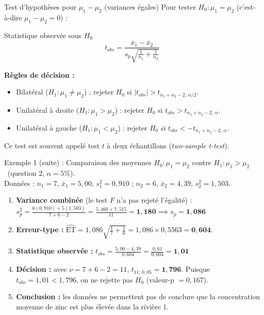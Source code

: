 \documentclass{BeamerTemplate}
\begin{document}
\begin{frame}[t]{Test d'hypothèses pour $\mu_1 - \mu_2$ (variances égales)}
  Pour tester $H_0: \mu_1 = \mu_2$ (c'est-à-dire $\mu_1 - \mu_2 = 0$) :

  \bigskip
  \begin{Boite}{Statistique observée sous $H_0$}
    \[
      t_{obs} = \frac{\overline{x}_1 - \overline{x}_2}{s_p \sqrt{\frac{1}{n_1} + \frac{1}{n_2}}}
    \]
  \end{Boite}

  \medskip
  \textbf{Règles de décision :}
  \begin{itemize}\itemsep 3mm
    \item Bilatéral ($H_1: \mu_1 \ne \mu_2$) : rejeter $H_0$ si $|t_{obs}| > t_{n_1+n_2-2,\, \alpha/2}$.
    \item Unilatéral à droite ($H_1: \mu_1 > \mu_2$) : rejeter $H_0$ si $t_{obs} > t_{n_1+n_2-2,\, \alpha}$.
    \item Unilatéral à gauche ($H_1: \mu_1 < \mu_2$) : rejeter $H_0$ si $t_{obs} < -t_{n_1+n_2-2,\, \alpha}$.
  \end{itemize}
  Ce test est souvent appelé \alert{test $t$ à deux échantillons} (\emph{two-sample t-test}).
\end{frame}

\begin{frame}[t]{Exemple 1 (suite) : Comparaison des moyennes}
  $H_0: \mu_1 = \mu_2$ contre $H_1: \mu_1 > \mu_2$ \ (question 2, $\alpha = 5\%$). \\
  Données : $n_1 = 7$, $\bar{x}_1 = 5{,}00$, $s_1^2 = 0{,}910$ ; $n_2 = 6$, $\bar{x}_2 = 4{,}39$, $s_2^2 = 1{,}503$.

  \begin{enumerate}\itemsep 1mm
    \item \textbf{Variance combinée} (le test $F$ n'a pas rejeté l'égalité) :
      $\displaystyle s_p^2 = \frac{6(0{,}910) + 5(1{,}503)}{7 + 6 - 2} = \frac{5{,}460 + 7{,}515}{11} = \mathbf{1{,}180} \implies s_p = \mathbf{1{,}086}$
    \item \textbf{Erreur-type :}
      $\widehat{\text{ET}} = 1{,}086 \sqrt{\frac{1}{7} + \frac{1}{6}} = 1{,}086 \times 0{,}5563 = \mathbf{0{,}604}$.
    \item \textbf{Statistique observée :}
      $\displaystyle t_{obs} = \frac{5{,}00 - 4{,}39}{0{,}604} = \frac{0{,}61}{0{,}604} = \mathbf{1{,}01}$
    \item<2-> \textbf{Décision :}
      avec $\nu = 7 + 6 - 2 = 11$, $t_{11;\, 0{,}05} = \mathbf{1{,}796}$.
      Puisque $t_{obs} = 1{,}01 < 1{,}796$, on \alert{ne rejette pas $H_0$} (valeur-p $= 0{,}167$).
    \item<2-> \textbf{Conclusion :} les données ne permettent pas de conclure que la concentration moyenne de zinc est plus élevée dans la rivière 1.
  \end{enumerate}
\end{frame}
\end{document}
